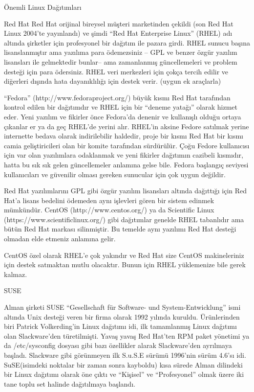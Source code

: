\begin{section}{Önemli Linux Dağıtımları}
\begin{subsection}{Red Hat}
Red Hat orijinal bireysel müşteri marketinden çekildi (son Red Hat Linux 2004'te yayınlandı) ve şimdi “Red Hat Enterprise Linux” (RHEL) adı altında şirketler için profesyonel bir dağıtım ile pazara girdi. RHEL sunucu başına lisanslanmıştır ama yazılıma para ödemezsiniz – GPL ve benzer özgür yazılım lisansları ile gelmektedir bunlar-- ama zamanlanmış güncellemeleri ve problem desteği için para ödersiniz. RHEL veri merkezleri için çokça tercih edilir ve diğerleri dışında hata dayanıklılığı için destek verir. (uygun ek araçlarla)

“Fedora” (http://www.fedoraproject.org/) büyük kısmı Red Hat tarafından kontrol edilen bir dağıtımdır ve RHEL için bir “deneme yatağı” olarak hizmet eder. Yeni yazılım ve fikirler önce Fedora'da denenir ve kullanışlı olduğu ortaya çıkanlar er ya da geç RHEL'de yerini alır. RHEL'in aksine Fedore satılmak yerine internette bedava olarak indirilebilir haldedir, proje bir kısmı Red Hat bir kısmı camia geliştiricileri olan bir komite tarafından sürdürülür. Çoğu Fedore kullanıcısı için var olan yazılımlara odaklanmak ve yeni fikirler dağıtımın cazibeli kısmıdır, hatta bu sık sık gelen güncellemeler anlamına gelse bile. Fedora başlangıç seviyesi kullanıcıları ve güvenilir olması gereken sunucular için çok uygun değildir.

Red Hat yazılımlarını GPL gibi özgür yazılım lisansları altında dağıttığı için Red Hat'a lisans bedelini ödemeden aynı işlevleri gören bir sistem edinmek mümkündür. CentOS (http://www.centos.org/) ya da Scientific Linux (https://www.scientificlinux.org/) gibi dağıtımlar genelde RHEL tabanlıdır ama bütün Red Hat markası silinmiştir. Bu temelde aynı yazılımı Red Hat desteği olmadan elde etmeniz anlamına gelir.

CentOS özel olarak RHEL'e çok yakındır ve Red Hat size CentOS makineleriniz için destek satmaktan mutlu olacaktır. Bunun için RHEL yüklemenize bile gerek kalmaz.

\end{subsection}
\begin{subsection}{SUSE}

Alman şirketi SUSE “Gesellschaft für Software- und System-Entwicklung” ismi altında Unix desteği veren bir firma olarak 1992 yılında kuruldu. Ürünlerinden biri Patrick Volkerding’in Linux dağıtımı idi, ilk tamamlanmış Linux dağıtımı olan Slackware'den türetilmişti. Yavaş yavaş Red Hat'ten RPM paket yönetimi ya da /etc/sysconfig dosyası gibi bazı özellikler alarak Slackware'den ayrılmaya başladı. Slackware gibi görünmeyen ilk S.u.S.E sürümü 1996'nin sürüm 4.6'sı idi. SuSE(isimdeki noktalar bir zaman sonra kayboldu) kısa sürede Alman dilindeki bir Linux dağıtımı olarak öne çıktı ve “Kişisel” ve “Profesyonel” olmak üzere iki tane toplu set halinde dağıtılmaya başlandı.


\end{subsection}
\end{section}
